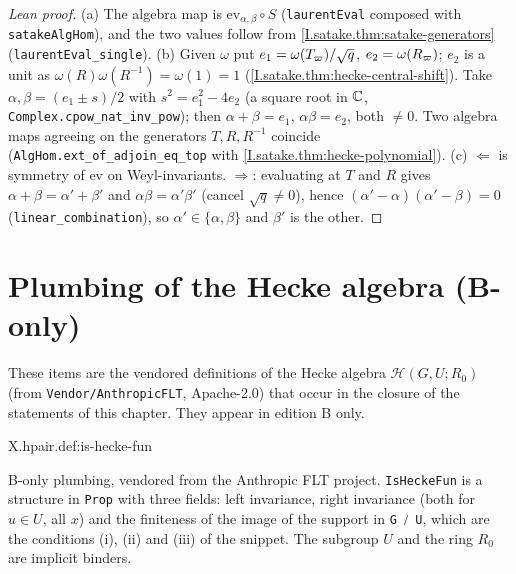 \begin{proof}[Lean proof]
(a) The algebra map is $\mathrm{ev}_{\alpha,\beta}\circ S$ (\texttt{laurentEval} composed with \texttt{satakeAlgHom}), and the two values follow from \cref{I.satake.thm:satake-generators} (\texttt{laurentEval\_single}). (b) Given $\omega$ put $e_1=\omega(T_\varpi)/\sqrt q$, $e_2=\omega(R_\varpi)$; $e_2$ is a unit as $\omega(R)\omega(R^{-1})=\omega(1)=1$ (\cref{I.satake.thm:hecke-central-shift}). Take $\alpha,\beta=(e_1\pm s)/2$ with $s^2=e_1^2-4e_2$ (a square root in $\mathbb{C}$, \texttt{Complex.cpow\_nat\_inv\_pow}); then $\alpha+\beta=e_1$, $\alpha\beta=e_2$, both $\ne0$. Two algebra maps agreeing on the generators $T,R,R^{-1}$ coincide (\texttt{AlgHom.ext\_of\_adjoin\_eq\_top} with \cref{I.satake.thm:hecke-polynomial}). (c) $\Leftarrow$ is symmetry of $\mathrm{ev}$ on Weyl-invariants. $\Rightarrow$: evaluating at $T$ and $R$ gives $\alpha+\beta=\alpha'+\beta'$ and $\alpha\beta=\alpha'\beta'$ (cancel $\sqrt q\ne0$), hence $(\alpha'-\alpha)(\alpha'-\beta)=0$ (\texttt{linear\_combination}), so $\alpha'\in\{\alpha,\beta\}$ and $\beta'$ is the other.
\end{proof}

\section{Plumbing of the Hecke algebra (B-only)}

\noindent These items are the vendored definitions of the Hecke algebra $\mathcal H(G,U;R_0)$ (from \texttt{Vendor/AnthropicFLT}, Apache-2.0) that occur in the closure of the statements of this chapter. They appear in edition B only.

\begin{definition}
\bonly
{}
\end{definition}
\begin{tfformal}{X.hpair.def:is-hecke-fun}
\begin{tffidelity}
B-only plumbing, vendored from the Anthropic FLT project. \texttt{IsHeckeFun} is a structure in \texttt{Prop} with three fields: left invariance, right invariance (both for $u\in U$, all $x$) and the finiteness of the image of the support in \texttt{G ⧸ U}, which are the conditions (i), (ii) and (iii) of the snippet. The subgroup $U$ and the ring $R_0$ are implicit binders.
\end{tffidelity}
\end{tfformal}

